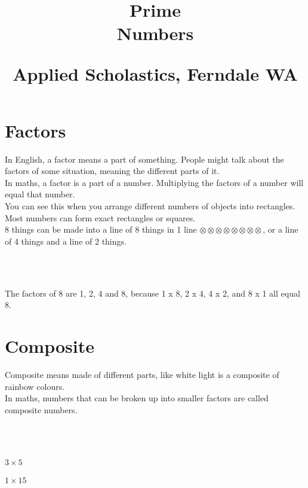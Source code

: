 \documentclass{article}
\author{}
\date{}
\title{Prime\\Numbers\\
\vspace{28pt}
\begin{normalsize}Applied Scholastics, Ferndale WA \end{normalsize}}
\begin{document}
\maketitle
\newpage
\Large

\section*{Factors}
In English, a factor means a part of something. People might talk about the factors of some situation, meaning the different parts of it.\\

In maths, a factor is a part of a number. Multiplying the factors of a number will equal that number.\\

You can see this when you arrange different numbers of objects into rectangles. Most numbers can form exact rectangles or squares.\\

8 things can be made into a line of 8 things in 1 line $\otimes\otimes\otimes\otimes\otimes\otimes\otimes\otimes$, or a line of 4 things and a line of 2 things.

\begin{center}
\otimes\otimes\otimes\otimes\\
\otimes\otimes\otimes\otimes\\
\end{center}

The factors of 8 are 1, 2, 4 and 8, because 1 x 8, 2 x 4, 4 x 2, and 8 x 1 all equal 8.

\pagebreak

\section*{Composite}
Composite means made of different parts, like white light is a composite of rainbow colours.\\

In maths, numbers that can be broken up into smaller factors are called composite numbers.

\begin{center}
\otimes\otimes\otimes\otimes\otimes\\
\otimes\otimes\otimes\otimes\otimes\\
\otimes\otimes\otimes\otimes\otimes\\
\vspace{16pt}
$3 \times 5$\\
\vspace{16pt}
\otimes\otimes\otimes\otimes\otimes
\otimes\otimes\otimes\otimes\otimes
\otimes\otimes\otimes\otimes\otimes\\
\vspace{16pt}
$1 \times 15$\\
\end{center}
\end{document}

